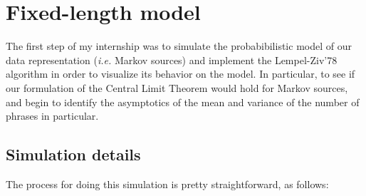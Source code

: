 






\medskip

\section{Fixed-length model}

The first step of my internship was to simulate the probabibilistic
model of our data representation (\emph{i.e.} Markov sources) and 
implement the Lempel-Ziv'78 algorithm in order to visualize its 
behavior on the model. In particular, to see if our formulation of the
Central Limit Theorem would hold for Markov sources, and begin to 
identify the asymptotics of the mean and variance of the number 
of phrases in particular.

\subsection{Simulation details}

The process for doing this simulation is pretty straightforward, 
as follows:
	
